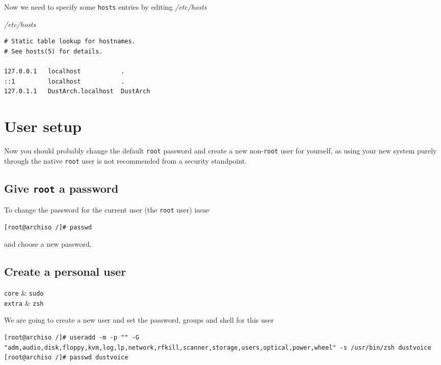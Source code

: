 \documentclass[10pt]{dustdoc}
\begin{document}
Now we need to specify some \texttt{hosts} entries by editing \textit{/etc/hosts}

\begin{mintedlisting}
    \caption*{\textit{/etc/hosts}}
    \begin{verbatim}
# Static table lookup for hostnames.
# See hosts(5) for details.

127.0.0.1   localhost           .
::1         localhost           .
127.0.1.1   DustArch.localhost  DustArch
    \end{verbatim}
\end{mintedlisting}

\section{User setup}
\label{sec:user-setup}

Now you should probably change the default \texttt{root} password and create a new non-\texttt{root} user for yourself, as using your new system purely through the native \texttt{root} user is not recommended from a security standpoint.

\subsection{Give \texttt{root} a password}
\label{sec:give-root-a-password}

To change the password for the current user (the \texttt{root} user) issue

\begin{verbatim}
[root@archiso /]# passwd
\end{verbatim}

\noindent
and choose a new password.

\subsection{Create a personal user}
\label{sec:create-a-personal-user}

\begin{packagetable}
    \texttt{core} & \texttt{sudo} \\ 
    \texttt{extra} & \texttt{zsh} \\ 
\end{packagetable}

We are going to create a new user and set the password, groups and shell for this user

\begin{verbatim}
[root@archiso /]# useradd -m -p "" -G "adm,audio,disk,floppy,kvm,log,lp,network,rfkill,scanner,storage,users,optical,power,wheel" -s /usr/bin/zsh dustvoice
[root@archiso /]# passwd dustvoice
\end{verbatim}
\end{document}
